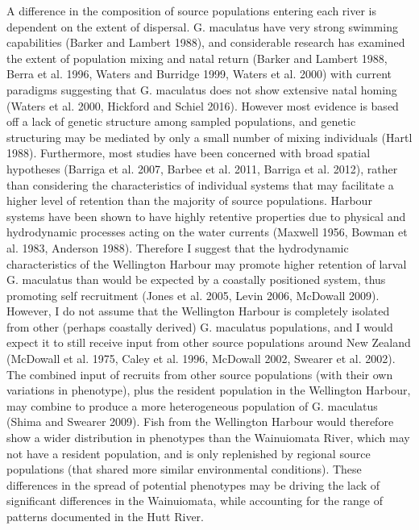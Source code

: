 \documentclass[]{book}
\begin{document}
A difference in the composition of source populations entering each
river is dependent on the extent of dispersal. G. maculatus have very
strong swimming capabilities (Barker and Lambert 1988), and considerable
research has examined the extent of population mixing and natal return
(Barker and Lambert 1988, Berra et al. 1996, Waters and Burridge 1999,
Waters et al. 2000) with current paradigms suggesting that G. maculatus
does not show extensive natal homing (Waters et al. 2000, Hickford and
Schiel 2016). However most evidence is based off a lack of genetic
structure among sampled populations, and genetic structuring may be
mediated by only a small number of mixing individuals (Hartl 1988).
Furthermore, most studies have been concerned with broad spatial
hypotheses (Barriga et al. 2007, Barbee et al. 2011, Barriga et al.
2012), rather than considering the characteristics of individual systems
that may facilitate a higher level of retention than the majority of
source populations. Harbour systems have been shown to have highly
retentive properties due to physical and hydrodynamic processes acting
on the water currents (Maxwell 1956, Bowman et al. 1983, Anderson 1988).
Therefore I suggest that the hydrodynamic characteristics of the
Wellington Harbour may promote higher retention of larval G. maculatus
than would be expected by a coastally positioned system, thus promoting
self recruitment (Jones et al. 2005, Levin 2006, McDowall 2009).
However, I do not assume that the Wellington Harbour is completely
isolated from other (perhaps coastally derived) G. maculatus
populations, and I would expect it to still receive input from other
source populations around New Zealand (McDowall et al. 1975, Caley et
al. 1996, McDowall 2002, Swearer et al. 2002). The combined input of
recruits from other source populations (with their own variations in
phenotype), plus the resident population in the Wellington Harbour, may
combine to produce a more heterogeneous population of G. maculatus
(Shima and Swearer 2009). Fish from the Wellington Harbour would
therefore show a wider distribution in phenotypes than the Wainuiomata
River, which may not have a resident population, and is only replenished
by regional source populations (that shared more similar environmental
conditions). These differences in the spread of potential phenotypes may
be driving the lack of significant differences in the Wainuiomata, while
accounting for the range of patterns documented in the Hutt River.
\end{document}
